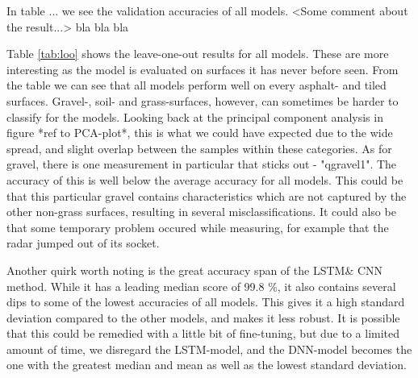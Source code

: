 In table ... we see the validation accuracies of all models. <Some comment about the result...> bla bla bla

Table \ref{tab:loo} shows the leave-one-out results for all models. These are more interesting as the model is evaluated on surfaces it has never before seen. From the table we can see that all models perform well on every asphalt- and tiled surfaces. Gravel-, soil- and grass-surfaces, however, can sometimes be harder to classify for the models. Looking back at the principal component analysis in figure *ref to PCA-plot*, this is what we could have expected due to the wide spread, and slight overlap between the samples within these categories. As for gravel, there is one measurement in particular that sticks out - "qgravel1". The accuracy of this is well below the average accuracy for all models. This could be that this particular gravel contains characteristics which are not captured by the other non-grass surfaces, resulting in several misclassifications. It could also be that some temporary problem occured while measuring, for example that the radar jumped out of its socket.

Another quirk worth noting is the great accuracy span of the LSTM\& CNN method. While it has a leading median score of 99.8 \%, it also contains several dips to some of the lowest accuracies of all models. This gives it a high standard deviation compared to the other models, and makes it less robust. It is possible that this could be remedied with a little bit of fine-tuning, but due to a limited amount of time, we disregard the LSTM-model, and the DNN-model becomes the one with the greatest median and mean as well as the lowest standard deviation.








